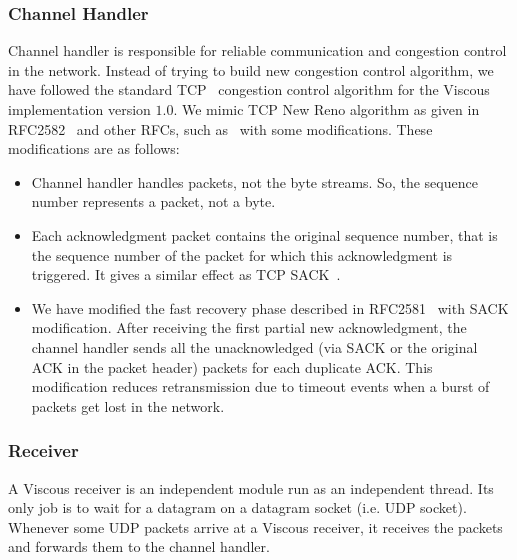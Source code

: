 \subsubsection{Channel Handler}
Channel handler is responsible for reliable communication and congestion control in the network. Instead of trying to build new congestion control algorithm, we have followed the standard TCP~\cite{RFC2582} congestion control algorithm for the Viscous implementation version $1.0$. We mimic TCP New Reno algorithm as given in RFC2582~\cite{RFC2582} and other RFCs, such as~\cite{RFC2581,RFC2988,RFC2001,RFC0793} with some modifications. These modifications are as follows:
\begin{itemize}
    \item Channel handler handles packets, not the byte streams. So, the sequence number represents a packet, not a byte. 
    \item Each acknowledgment packet contains the original sequence number, that is the sequence number of the packet for which this acknowledgment is triggered. It gives a similar effect as TCP SACK~\cite{RFC2018}.
    \item We have modified the fast recovery phase described in RFC2581~\cite{RFC2582} with SACK modification. After receiving the first partial new acknowledgment, the channel handler sends all the unacknowledged (via SACK or the original ACK in the packet header) packets for each duplicate ACK. This modification reduces retransmission due to timeout events when a burst of packets get lost in the network.
\end{itemize}

\subsubsection{Receiver}
A Viscous receiver is an independent module run as an independent thread. Its only job is to wait for a datagram on a datagram socket (i.e. UDP socket). Whenever some UDP packets arrive at a Viscous receiver, it receives the packets and forwards them to the channel handler.

